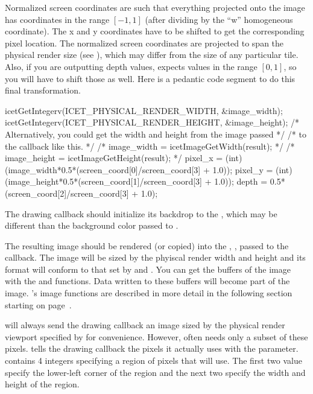 Normalized screen coordinates are such that everything projected onto the
image has coordinates in the range $[-1,1]$ (after dividing by the ``w''
homogeneous coordinate).  The x and y coordinates have to be shifted to get
the corresponding pixel location.  The normalized screen coordinates are
projected to span the physical render size (see
), which may differ from the size of any
particular tile.  Also, if you are outputting depth values, \IceT expects
values in the range $[0,1]$, so you will have to shift those as well.  Here
is a pedantic code segment to do this final transformation.

\begin{code}
icetGetIntegerv(ICET_PHYSICAL_RENDER_WIDTH, &image_width);
icetGetIntegerv(ICET_PHYSICAL_RENDER_HEIGHT, &image_height);
/* Alternatively, you could get the width and height from the image passed */
/* to the callback like this.                                              */
/* image_width = icetImageGetWidth(result);                                */
/* image_height = icetImageGetHeight(result);                              */
pixel_x = (int)(image_width*0.5*(screen_coord[0]/screen_coord[3] + 1.0));
pixel_y = (int)(image_height*0.5*(screen_coord[1]/screen_coord[3] + 1.0));
depth = 0.5*(screen_coord[2]/screen_coord[3] + 1.0);
\end{code}

The drawing callback should initialize its backdrop to the
, which may be different than the background color
passed to .

The resulting image should be rendered (or copied) into the
, , passed to the callback.  The image will
be sized by the phyiscal render width and height and its format will
conform to that set by  and
.  You can get the buffers of the image with the
\icetImageGetColor and \icetImageGetDepth functions.  Data written to these
buffers will become part of the image.  \IceT's image functions are
described in more detail in the following section starting on
page~\pageref{sec:Basic_Usage:Image_Objects}.

\IceT will always send the drawing callback an image sized by the physical
render viewport specified by  for
convenience.  However, \IceT often needs only a subset of these pixels.
\IceT tells the drawing callback the pixels it actually uses with the
 parameter.   contains 4
integers specifying a region of pixels that \IceT will use.  The first two
value specify the lower-left corner of the region and the next two specify
the width and height of the region.

